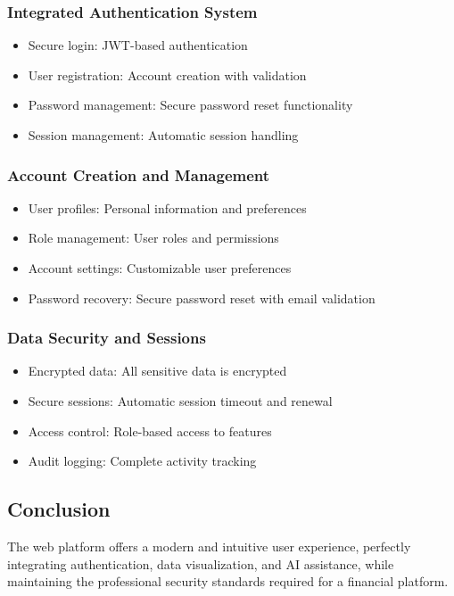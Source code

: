 \subsubsection{Integrated Authentication System}
\begin{itemize}
    \item Secure login: JWT-based authentication
    \item User registration: Account creation with validation
    \item Password management: Secure password reset functionality
    \item Session management: Automatic session handling
\end{itemize}

\subsubsection{Account Creation and Management}
\begin{itemize}
    \item User profiles: Personal information and preferences
    \item Role management: User roles and permissions
    \item Account settings: Customizable user preferences
    \item Password recovery: Secure password reset with email validation
\end{itemize}

\subsubsection{Data Security and Sessions}
\begin{itemize}
    \item Encrypted data: All sensitive data is encrypted
    \item Secure sessions: Automatic session timeout and renewal
    \item Access control: Role-based access to features
    \item Audit logging: Complete activity tracking
\end{itemize}

\subsection{Conclusion}
The web platform offers a modern and intuitive user experience, perfectly integrating authentication, data visualization, and AI assistance, while maintaining the professional security standards required for a financial platform.
